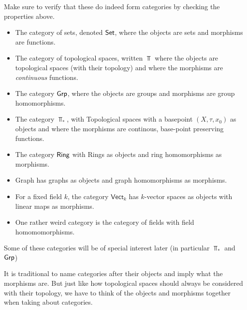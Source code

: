 \begin{ex}[]
  Make sure to verify that these do indeed form categories by checking the properties above.
  \begin{itemize}
    \item The category of sets, denoted $\text{\sffamily Set}$, where the objects are sets and morphisms are functions.
    \item The category of topological spaces, written $\Top$ where the objects are topological spaces (with their topology) and where the morphisms are \emph{continuous} functions.
    \item The category $\text{\sffamily Grp}$, where the objects are groups and morphisms are group homomorphisms.
    \item The category $\Top_{\ast}$, with Topological spaces with a basepoint $(X,\tau,x_0)$ as objects and where the morphisms are continous, base-point preserving functions.
    \item The category $\text{\sffamily Ring}$ with Rings as objects and ring homomorphisms as morphisms.
    \item \textsf{Graph} has graphs as objects and graph homomorphisms as morphisms.
    \item For a fixed field $k$, the category $\textsf{Vect}_k$ has $k$-vector spaces as objects with linear maps as morphisms.
    \item One rather weird category is the category of fields with field homomomorphisms.
  \end{itemize}
  Some of these categories will be of special interest later (in particular $\Top_{\ast}$ and $\text{\sffamily Grp}$)
\end{ex}

It is traditional to name categories after their objects and imply what the morphisms are.
But just like how topological spaces should always be considered with their topology, we have to think of the objects and morphisms together when taking about categories.


